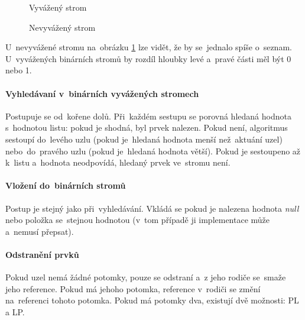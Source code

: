 \begin{figure}[ht]
	\begin{minipage}[b]{0.47\textwidth}
		\centering
		\caption{Vyvážený strom}
		\label{even_binary_tree}
 	\end{minipage}
	\hspace*{1em}%
 	\begin{minipage}[b]{0.47\textwidth}
 		\centering
		\caption{Nevyvážený strom}
		\label{noneven_binary_tree}
	\end{minipage}
\end{figure}

U~nevyvážené stromu na~obrázku \ref{noneven_binary_tree} lze vidět, že by se~jednalo spíše o~seznam. U~vyvážených binárních stromů by rozdíl hloubky levé a~pravé části měl být 0 nebo 1.

\paragraph{Vyhledávaní v~binárních vyvážených stromech} Postupuje se od~kořene dolů. Při~každém sestupu se porovná hledaná hodnota s~hodnotou listu: pokud je shodná, byl prvek nalezen. Pokud není, algoritmus sestoupí do~levého uzlu (pokud je~hledaná hodnota menší než~aktuání uzel) nebo~do~pravého uzlu (pokud je~hledaná hodnota větší). Pokud je sestoupeno až k~listu a~hodnota neodpovídá, hledaný prvek ve~stromu není.

\paragraph{Vložení do~binárních stromů} Postup je stejný jako při~vyhledávání. Vkládá se pokud je nalezena hodnota \emph{null} nebo položka se~stejnou hodnotou (v~tom případě ji implementace může a~nemusí přepsat).

\paragraph{Odstranění prvků} Pokud uzel nemá žádné potomky, pouze se odstraní a~z jeho rodiče se~smaže jeho reference. Pokud má jehoho potomka, reference v~rodiči se změní na~referenci tohoto potomka. Pokud má potomky dva, existují dvě možnosti: PL a LP.

